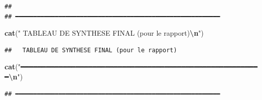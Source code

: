 \documentclass[
]{article}
\newenvironment{Shaded}{\begin{snugshade}}{\end{snugshade}}
\newcommand{\FunctionTok}[1]{\textcolor[rgb]{0.13,0.29,0.53}{\textbf{#1}}}
\newcommand{\NormalTok}[1]{#1}
\newcommand{\SpecialCharTok}[1]{\textcolor[rgb]{0.81,0.36,0.00}{\textbf{#1}}}
\newcommand{\StringTok}[1]{\textcolor[rgb]{0.31,0.60,0.02}{#1}}
\begin{document}
\begin{verbatim}
## 
## ━━━━━━━━━━━━━━━━━━━━━━━━━━━━━━━━━━━━━━━━━━━━━━━━━━━━━━━━━
\end{verbatim}

\begin{Shaded}
\begin{Highlighting}[]
\FunctionTok{cat}\NormalTok{(}\StringTok{"  TABLEAU DE SYNTHESE FINAL (pour le rapport)}\SpecialCharTok{\textbackslash{}n}\StringTok{"}\NormalTok{)}
\end{Highlighting}
\end{Shaded}

\begin{verbatim}
##   TABLEAU DE SYNTHESE FINAL (pour le rapport)
\end{verbatim}

\begin{Shaded}
\begin{Highlighting}[]
\FunctionTok{cat}\NormalTok{(}\StringTok{"━━━━━━━━━━━━━━━━━━━━━━━━━━━━━━━━━━━━━━━━━━━━━━━━━━━━━━━━━}\SpecialCharTok{\textbackslash{}n}\StringTok{"}\NormalTok{)}
\end{Highlighting}
\end{Shaded}

\begin{verbatim}
## ━━━━━━━━━━━━━━━━━━━━━━━━━━━━━━━━━━━━━━━━━━━━━━━━━━━━━━━━━
\end{verbatim}
\end{document}
